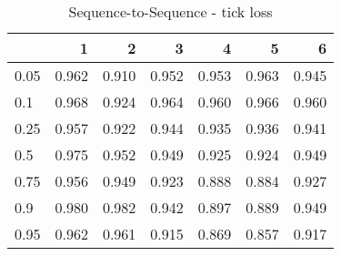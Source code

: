 \documentclass{article}
\begin{document}
\begin{table}[h!]
\centering
\caption{Sequence-to-Sequence - tick loss}
\label{tab: Sequence-to-Sequence tic}
\begin{tabular}{lrrrrrr}
\toprule
 & 1 & 2 & 3 & 4 & 5 & 6 \\
\midrule
0.05 & 0.962 & 0.910 & 0.952 & 0.953 & 0.963 & 0.945 \\
0.1 & 0.968 & 0.924 & 0.964 & 0.960 & 0.966 & 0.960 \\
0.25 & 0.957 & 0.922 & 0.944 & 0.935 & 0.936 & 0.941 \\
0.5 & 0.975 & 0.952 & 0.949 & 0.925 & 0.924 & 0.949 \\
0.75 & 0.956 & 0.949 & 0.923 & 0.888 & 0.884 & 0.927 \\
0.9 & 0.980 & 0.982 & 0.942 & 0.897 & 0.889 & 0.949 \\
0.95 & 0.962 & 0.961 & 0.915 & 0.869 & 0.857 & 0.917 \\
\bottomrule
\end{tabular}
\end{table}
\end{document}
